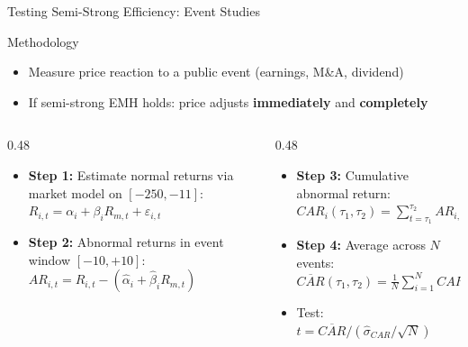 \documentclass[9pt, aspectratio=169, t]{beamer}
\theoremstyle{definition}
\newenvironment{cminipage}[1]{%
    \par\noindent\hfill\begin{minipage}{#1}\ignorespaces
}{%
    \end{minipage}\hfill\null\par
}
\begin{document}
\begin{frame}{Testing Semi-Strong Efficiency: Event Studies}
\begin{cminipage}{0.95\textwidth}
\begin{block}{Methodology}
\begin{itemize}\setlength{\itemsep}{0pt}
    \item Measure price reaction to a public event (earnings, M\&A, dividend)
    \item If semi-strong EMH holds: price adjusts \textbf{immediately} and \textbf{completely}
\end{itemize}
\end{block}

\small
\begin{columns}[T]
\begin{column}{0.48\textwidth}
\begin{itemize}\setlength{\itemsep}{0pt}
    \item \textbf{Step 1:} Estimate normal returns via market model on $[-250, -11]$:
    $R_{i,t} = \alpha_i + \beta_i R_{m,t} + \varepsilon_{i,t}$
    \item \textbf{Step 2:} Abnormal returns in event window $[-10, +10]$:
    $AR_{i,t} = R_{i,t} - (\hat{\alpha}_i + \hat{\beta}_i R_{m,t})$
\end{itemize}
\end{column}
\begin{column}{0.48\textwidth}
\begin{itemize}\setlength{\itemsep}{0pt}
    \item \textbf{Step 3:} Cumulative abnormal return:
    $CAR_i(\tau_1, \tau_2) = \sum_{t=\tau_1}^{\tau_2} AR_{i,t}$
    \item \textbf{Step 4:} Average across $N$ events:
    $\overline{CAR}(\tau_1, \tau_2) = \frac{1}{N}\sum_{i=1}^{N} CAR_i$
    \item Test: $t = \overline{CAR}\big/(\hat{\sigma}_{CAR}/\sqrt{N})$
\end{itemize}
\end{column}
\end{columns}
\end{cminipage}
\end{frame}
\end{document}
